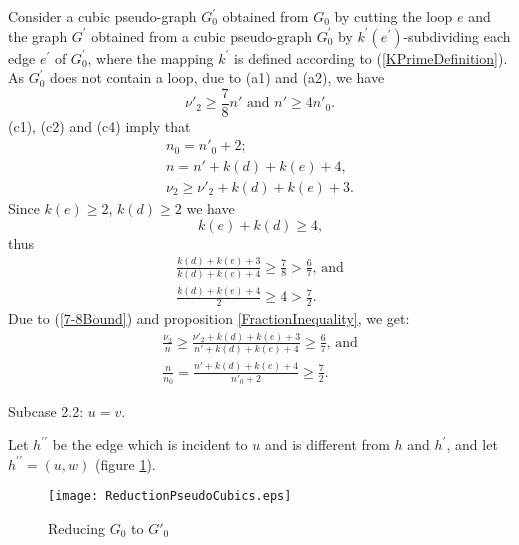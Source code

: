 \documentclass[fleqn,12pt,twoside]{article}
\newenvironment{proof}[1][Proof.]{\begin{trivlist}
\item[\hskip \labelsep {\bfseries #1}]}{\end{trivlist}}
\begin{document}
\begin{proof}
Consider a cubic pseudo-graph $G_{0}^{\prime }$ obtained from
$G_{0}$ by cutting the loop $e$ and the graph $G^{\prime }$ obtained
from a cubic pseudo-graph $G_{0}^{\prime }$ by $k^{\prime
}(e^{\prime })$-subdividing each edge $e^{\prime }$ of
$G_{0}^{\prime }$, where the mapping $k^{\prime }$ is defined
according to (\ref{KPrimeDefinition}). As $G_{0}^{\prime }$ does
not contain a loop, due to (a1) and (a2), we have\begin{equation}
\nu' _{2}\geq \frac{7}{8}n' \text{ and }n' \geq 4n'_0.
\label{7-8Bound}
\end{equation}(c1), (c2) and (c4) imply that\begin{gather*}
n_0 =n'_0+2;
\\
n =n'+k(d)+k(e)+4\text{,} \\
\nu _{2}\geq \nu' _{2}+k(d)+k(e)+3.
\end{gather*}Since $k(e)\geq 2$, $k(d)\geq 2$ we have
\begin{equation*}
k(e)+k(d)\geq 4\text{,}
\end{equation*}thus
\begin{gather*}
\frac{k(d)+k(e)+3}{k(d)+k(e)+4}\geq \frac{7}{8}>\frac{6}{7}\text{, and} \\
\frac{k(d)+k(e)+4}{2}\geq 4>\frac{7}{2}\text{.}
\end{gather*}Due to (\ref{7-8Bound}) and proposition \ref{FractionInequality}, we
get:
\begin{gather*}
\frac{\nu _{2}}{n }\geq \frac{\nu' _{2}+k(d)+k(e)+3}{n'+k(d)+k(e)+4}\geq \frac{6}{7}\text{, and} \\
\frac{n}{n_0}=\frac{n'+k(d)+k(e)+4}{n'_0+2}\geq \frac{7}{2}.
\end{gather*}

Subcase 2.2: $u=v$.

Let $h^{\prime \prime }$ be the edge which is incident to $u$ and is
different from $h$ and $h^{\prime }$, and let $h^{\prime \prime
}=(u,w)$ (figure \ref{Reduction}).

\begin{figure}[h]
\begin{center}
\texttt{[image: ReductionPseudoCubics.eps]}\\
\caption{Reducing $G_{0}$ to $G'_{0}$}\label{Reduction}
\end{center}
\end{figure}


\end{proof}
\end{document}
